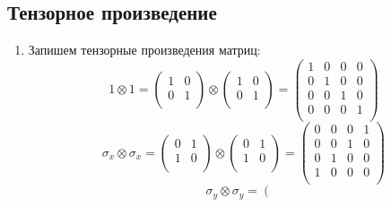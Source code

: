 \documentclass[12pt]{article}
\begin{document}
\subsection{Тензорное произведение}
\begin{enumerate}
    \item Запишем тензорные произведения матриц:
    \begin{equation}
        1\otimes1=
        \left(\begin{array}{cccc}
        1 & 0\\
        0 & 1\\
        \end{array}\right)\otimes
        \left(\begin{array}{cccc}
        1 & 0\\
        0 & 1\\
        \end{array}\right)=\left(\begin{array}{cccc}
        1 & 0 & 0 & 0\\
        0 & 1 & 0 & 0\\
        0 & 0 & 1 & 0\\
        0 & 0 & 0 & 1\\
        \end{array}\right)
    \end{equation}
    \begin{equation}
        \sigma_x\otimes\sigma_x=
        \left(\begin{array}{cccc}
        0 & 1\\
        1 & 0\\
        \end{array}\right)\otimes
        \left(\begin{array}{cccc}
        0 & 1\\
        1 & 0\\
        \end{array}\right)=\left(\begin{array}{cccc}
        0 & 0 & 0 & 1\\
        0 & 0 & 1 & 0\\
        0 & 1 & 0 & 0\\
        1 & 0 & 0 & 0\\
        \end{array}\right)
    \end{equation}
    \begin{equation}
        \sigma_y\otimes\sigma_y=
        \left(\begin{array}{cccc}

\end{array}
\end{equation}
\end{enumerate}
\end{document}
